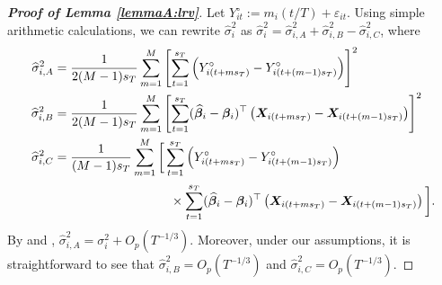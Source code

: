 \documentclass[12pt]{article}
\begin{document}
\begin{proof}[\textnormal{\textbf{Proof of Lemma \ref{lemmaA:lrv}}}]
Let $Y_{it}^\circ := m_i(t/T) + \varepsilon_{it}$. Using simple arithmetic calculations, we can rewrite $\widehat{\sigma}_i^2$ as $\widehat{\sigma}_i^2 = \widehat{\sigma}_{i,A}^2 + \widehat{\sigma}_{i,B}^2 - \widehat{\sigma}_{i,C}^2$, where
\begin{align}
\widehat{\sigma}_{i,A}^2 &= \frac{1}{2(M-1)s_T}\sum_{m=1}^M \left[\sum_{t = 1}^{s_T} \left(Y_{i(t + ms_T)}^\circ - Y_{i(t + (m-1)s_T)}^\circ\right)\right]^2 \nonumber\\
\widehat{\sigma}_{i,B}^2 &= \frac{1}{2(M-1)s_T}\sum_{m=1}^M \left[\sum_{t = 1}^{s_T} (\widehat{\bfbeta}_i - \bfbeta_i)^\top\left(\X_{i(t+ms_T)} - \X_{i(t+(m-1)s_T)}\right) \right]^2 \nonumber \\
\widehat{\sigma}_{i,C}^2 &= \frac{1}{(M-1)s_T}\sum_{m=1}^M \bigg[\sum_{t = 1}^{s_T}  \left(Y_{i(t + ms_T)}^\circ - Y_{i(t + (m-1)s_T)}^\circ\right) \nonumber \\ & \phantom{\quad - \frac{1}{(M-1)s_T}\sum_{m=1}^M \bigg[} \times \sum_{t = 1}^{s_T} (\widehat{\bfbeta}_i - \bfbeta_i)^\top\left(\X_{i(t+ms_T)} - \X_{i(t+(m-1)s_T)}\right) \bigg]. \nonumber
\end{align}
By \cite{Carlstein1986} and \cite{WuZhao2007}, $\widehat{\sigma}_{i,A}^2 = \sigma_i^2 + O_p(T^{-1/3})$. Moreover, under our assumptions, it is straightforward to see that $\widehat{\sigma}_{i,B}^2 = O_p(T^{-1/3})$ and $\widehat{\sigma}_{i,C}^2 = O_p(T^{-1/3})$.

\end{proof}
\end{document}
